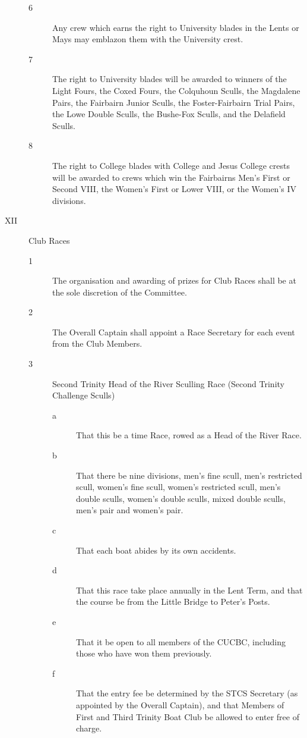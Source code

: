 \documentclass{article}
\begin{document}
\begin{description}
\begin{description}
		\item[6] Any crew which earns the right to University blades in the Lents or Mays may
		emblazon them with the University crest.\\
		
		\item[7] The right to University blades will be awarded to winners of the Light Fours,
		the Coxed Fours, the Colquhoun Sculls, the Magdalene Pairs, the Fairbairn
		Junior Sculls, the Foster-Fairbairn Trial Pairs, the Lowe Double Sculls, the
		Bushe-Fox Sculls, and the Delafield Sculls.\\
		
		\item[8] The right to College blades with College and Jesus College crests will be
		awarded to crews which win the Fairbairns Men's First or Second VIII, the
		Women's First or Lower VIII, or the Women's IV divisions.\\
	\end{description}

	\item[XII] Club Races
	\begin{description}
		\item[1] The organisation and awarding of prizes for Club Races shall be at the sole
		discretion of the Committee.\\
		
		\item[2] The Overall Captain shall appoint a Race Secretary for each event from the
		Club Members.\\
		
		\item[3] Second Trinity Head of the River Sculling Race (Second Trinity Challenge
		Sculls)
		\begin{description}
			\item[a] That this be a time Race, rowed as a Head of the River Race.
			\item[b] That there be nine divisions, men's fine scull, men’s restricted scull,
			women's fine scull, women’s restricted scull, men’s double sculls,
			women’s double sculls, mixed double sculls, men’s pair and women’s
			pair.
			\item[c] That each boat abides by its own accidents.
			\item[d] That this race take place annually in the Lent Term, and that the course
			be from the Little Bridge to Peter's Posts.
			\item[e] That it be open to all members of the CUCBC, including those who
			have won them previously.
			\item[f] That the entry fee be determined by the STCS Secretary (as appointed
			by the Overall Captain), and that Members of First and Third Trinity
			Boat Club be allowed to enter free of charge.\\
		\end{description}
		

\end{description}
\end{description}
\end{document}
